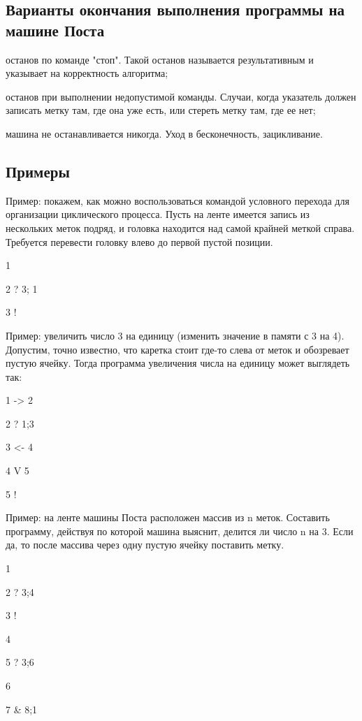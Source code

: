 \documentclass{article}
\begin{document}
\subsection{Варианты окончания выполнения программы на машине Поста}

останов по команде "стоп". 
Такой останов называется результативным и указывает на корректность алгоритма;

останов при выполнении недопустимой команды. 
Случаи, когда указатель должен записать метку там, где она уже есть, 
или стереть метку там, где ее нет;

машина не останавливается никогда. Уход в бесконечность, зацикливание.


\subsection{Примеры}

Пример: покажем, как можно воспользоваться командой условного перехода 
для организации циклического процесса. 
Пусть на ленте имеется запись из нескольких меток подряд, 
и головка находится над самой крайней меткой справа. 
Требуется перевести головку влево до первой пустой позиции.

			1

			2 ? 3; 1

			3 !


 Пример: увеличить число 3 на единицу (изменить значение в памяти с 3 на 4). 
 Допустим, точно известно, что каретка стоит где-то слева от меток и обозревает пустую ячейку. 
 Тогда программа увеличения числа на единицу может выглядеть так:

 1 -> 2

 2 ? 1;3

 3 <- 4

 4 V 5

 5 !
 


Пример: на ленте машины Поста расположен массив из n меток. 
Составить программу, действуя по которой машина выяснит, делится ли число n на 3. 
Если да, то после массива через одну пустую ячейку поставить метку.

1 

2 ? 3;4

3 !

4 

5 ? 3;6

6 

7 & 8;1
\end{document}

